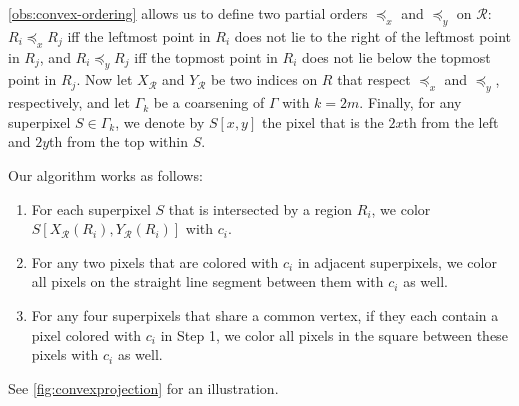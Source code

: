 \documentclass[a4paper, 11pt]{article}
\begin{document}
\cref{obs:convex-ordering} allows us to define two partial orders \(\preceq_x\) and \(\preceq_y\) on \(\mathcal{R}\): \(R_i \preceq_x R_j\) iff the leftmost point in \(R_i\) does not lie to the right of the leftmost point in \(R_j\), and \(R_i \preceq_y R_j\) iff the topmost point in \(R_i\) does not lie below the topmost point in \(R_j\). Now let \(X_\mathcal{R}\) and \(Y_\mathcal{R}\) be two indices on \(R\) that respect \(\preceq_x\) and \(\preceq_y\), respectively, and let \(\Gamma_k\) be a coarsening of \(\Gamma\) with \(k = 2m\). Finally, for any superpixel \(S \in \Gamma_k\), we denote by \(S[x, y]\) the pixel that is the \(2x\)th from the left and \(2y\)th from the top within \(S\).

Our algorithm works as follows:

\begin{enumerate}
	\item For each superpixel \(S\) that is intersected by a region \(R_i\), we color \(S[X_\mathcal{R}(R_i), Y_\mathcal{R}(R_i)]\) with \(c_i\).
	\item For any two pixels that are colored with \(c_i\) in adjacent superpixels, we color all pixels on the straight line segment between them with \(c_i\) as well.
	\item For any four superpixels that share a common vertex, if they each contain a pixel colored with \(c_i\) in Step 1, we color all pixels in the square between these pixels with \(c_i\) as well.
\end{enumerate}

\noindent
See \cref{fig:convexprojection} for an illustration.
\end{document}
